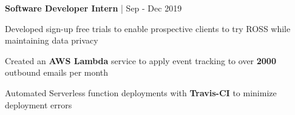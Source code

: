 \begin{cventries}

\cventry
{\textbf{Software Developer Intern} | \color{awesome}{ROSS Intelligence}}
{Sep - Dec 2019} %
{ %
\begin{cvitems}
\item {Developed sign-up free trials to enable prospective clients to try ROSS while maintaining data privacy}
\item {Created an \textbf{AWS Lambda} service to apply event tracking to over \textbf{2000} outbound emails per month}
\item {Automated Serverless function deployments with \textbf{Travis-CI} to minimize deployment errors}
\end{cvitems}
}








\end{cventries}
